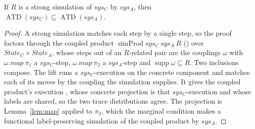 \begin{theorem}
  \label{thm:strongsound}
  \leanok
  If $R$ is a strong simulation of $sys_C$ by $sys_A$, then $\operatorname{ATD}(sys_C) \subseteq \operatorname{ATD}(sys_A)$.
\end{theorem}

\begin{proof}\leanok
  A strong simulation matches each step by a single step, so the proof factors through the coupled product $\operatorname{simProd} sys_C\ sys_A\ R$ () over $State_C \times State_A$, whose steps out of an $R$-related pair are the couplings $\omega$ with $\omega.map\ \pi_1$ a $sys_C$-step, $\omega.map\ \pi_2$ a $sys_A$-step and $\operatorname{supp}\omega \subseteq R$.
  Two inclusions compose.
  The lift  runs a $sys_C$-execution on the concrete component and matches each of its moves by the coupling the simulation supplies.
  It gives the coupled product's execution , whose concrete projection is that $sys_C$-execution and whose labels are shared, so the two trace distributions agree.
  The projection is Lemma~\ref{lem:map} applied to $\pi_2$, which the marginal condition makes a functional label-preserving simulation of the coupled product by $sys_A$.
\end{proof}
